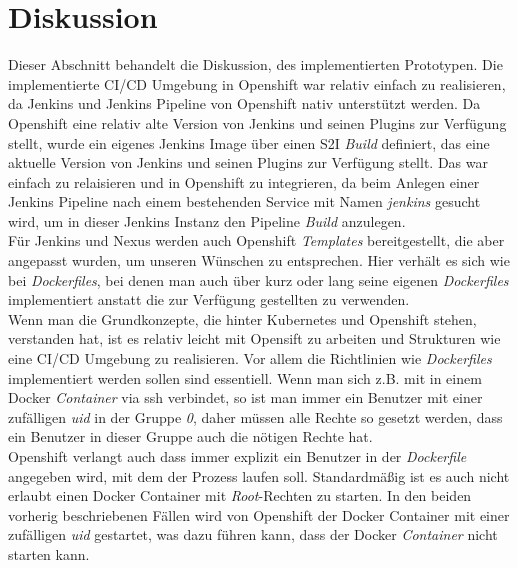 \section{Diskussion}
\label{sec:discussion}
Dieser Abschnitt behandelt die Diskussion, des implementierten Prototypen. Die implementierte CI/CD Umgebung in Openshift war relativ einfach zu realisieren, da Jenkins und Jenkins Pipeline von Openshift nativ unterstützt werden. Da Openshift eine relativ alte Version von Jenkins und seinen Plugins zur Verfügung stellt, wurde ein eigenes Jenkins Image über einen S2I \emph{Build} definiert, das eine aktuelle Version von Jenkins und seinen Plugins zur Verfügung stellt. Das war einfach zu relaisieren und in Openshift zu integrieren, da beim Anlegen einer Jenkins Pipeline nach einem bestehenden Service mit Namen \emph{jenkins} gesucht wird, um in dieser Jenkins Instanz den Pipeline \emph{Build} anzulegen. \\

Für Jenkins und Nexus werden auch Openshift \emph{Templates} bereitgestellt, die aber angepasst wurden, um unseren Wünschen zu entsprechen. Hier verhält es sich wie bei \emph{Dockerfiles}, bei denen man auch über kurz oder lang seine eigenen \emph{Dockerfiles} implementiert anstatt die zur Verfügung gestellten zu verwenden.\\

Wenn man die Grundkonzepte, die hinter Kubernetes und Openshift stehen, verstanden hat, ist es relativ leicht mit Opensift zu arbeiten und Strukturen wie eine CI/CD Umgebung zu realisieren. Vor allem die Richtlinien wie \emph{Dockerfiles} implementiert werden sollen sind essentiell. Wenn man sich z.B. mit  in einem Docker \emph{Container} via ssh verbindet, so ist man immer ein Benutzer mit einer zufälligen \emph{uid} in der Gruppe \emph{0}, daher müssen alle Rechte so gesetzt werden, dass ein Benutzer in dieser Gruppe auch die nötigen Rechte hat. \\

Openshift verlangt auch dass immer explizit ein Benutzer in der \emph{Dockerfile} angegeben wird, mit dem der Prozess laufen soll. Standardmäßig ist es auch nicht erlaubt einen Docker Container mit \emph{Root}-Rechten zu starten. In den beiden vorherig beschriebenen Fällen wird von Openshift der Docker Container mit einer zufälligen \emph{uid} gestartet, was dazu führen kann, dass der Docker \emph{Container} nicht starten kann.
